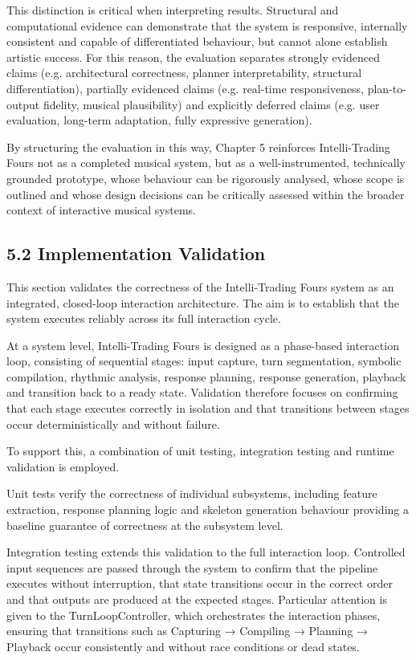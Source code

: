 This distinction is critical when interpreting results. Structural and
computational evidence can demonstrate that the system is responsive,
internally consistent and capable of differentiated behaviour, but
cannot alone establish artistic success. For this reason, the evaluation
separates strongly evidenced claims (e.g. architectural correctness,
planner interpretability, structural differentiation), partially
evidenced claims (e.g. real-time responsiveness, plan-to-output
fidelity, musical plausibility) and explicitly deferred claims (e.g.
user evaluation, long-term adaptation, fully expressive generation).

By structuring the evaluation in this way, Chapter 5 reinforces
Intelli-Trading Fours not as a completed musical system, but as a
well-instrumented, technically grounded prototype, whose behaviour can
be rigorously analysed, whose scope is outlined and whose design
decisions can be critically assessed within the broader context of
interactive musical systems.

\subsection{5.2 Implementation
Validation}\label{implementation-validation}

This section validates the correctness of the Intelli-Trading Fours
system as an integrated, closed-loop interaction architecture. The aim
is to establish that the system executes reliably across its full
interaction cycle.

At a system level, Intelli-Trading Fours is designed as a phase-based
interaction loop, consisting of sequential stages: input capture, turn
segmentation, symbolic compilation, rhythmic analysis, response
planning, response generation, playback and transition back to a ready
state. Validation therefore focuses on confirming that each stage
executes correctly in isolation and that transitions between stages
occur deterministically and without failure.

To support this, a combination of unit testing, integration testing and
runtime validation is employed.

Unit tests verify the correctness of individual subsystems, including
feature extraction, response planning logic and skeleton generation
behaviour providing a baseline guarantee of correctness at the subsystem
level.

Integration testing extends this validation to the full interaction
loop. Controlled input sequences are passed through the system to
confirm that the pipeline executes without interruption, that state
transitions occur in the correct order and that outputs are produced at
the expected stages. Particular attention is given to the
TurnLoopController, which orchestrates the interaction phases, ensuring
that transitions such as Capturing → Compiling → Planning → Playback
occur consistently and without race conditions or dead states.

